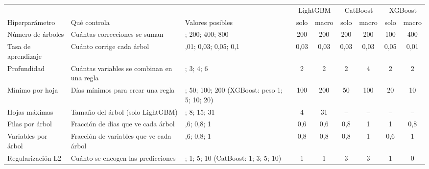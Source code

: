 \begin{tabular}{l >{\raggedright\arraybackslash}p{5.6cm} >{\raggedright\arraybackslash}p{5.4cm} cc cc cc}
\toprule
 & & & \multicolumn{2}{c}{LightGBM} & \multicolumn{2}{c}{CatBoost} & \multicolumn{2}{c}{XGBoost} \\
\cmidrule(lr){4-5}\cmidrule(lr){6-7}\cmidrule(lr){8-9}
Hiperparámetro & Qué controla & Valores posibles & solo & macro & solo & macro & solo & macro \\
\midrule
Número de árboles & Cuántas correcciones se suman & 100; 200; 400; 800 & 200 & 200 & 200 & 200 & 100 & 400 \\
Tasa de aprendizaje & Cuánto corrige cada árbol & 0,01; 0,03; 0,05; 0,1 & 0,03 & 0,03 & 0,03 & 0,03 & 0,05 & 0,01 \\
Profundidad & Cuántas variables se combinan en una regla & 2; 3; 4; 6 & 2 & 2 & 2 & 4 & 2 & 2 \\
Mínimo por hoja & Días mínimos para crear una regla & 20; 50; 100; 200 (XGBoost: peso 1; 5; 10; 20) & 100 & 200 & 50 & 100 & 20 & 10 \\
Hojas máximas & Tamaño del árbol (solo LightGBM) & 4; 8; 15; 31 & 4 & 31 & -- & -- & -- & -- \\
Filas por árbol & Fracción de días que ve cada árbol & 0,6; 0,8; 1 & 0,6 & 0,6 & 0,8 & 1 & 1 & 0,8 \\
Variables por árbol & Fracción de variables que ve cada árbol & 0,6; 0,8; 1 & 0,8 & 0,8 & 0,8 & 1 & 0,6 & 1 \\
Regularización L2 & Cuánto se encogen las predicciones & 0; 1; 5; 10 (CatBoost: 1; 3; 5; 10) & 1 & 1 & 3 & 3 & 1 & 0 \\
\bottomrule
\end{tabular}
